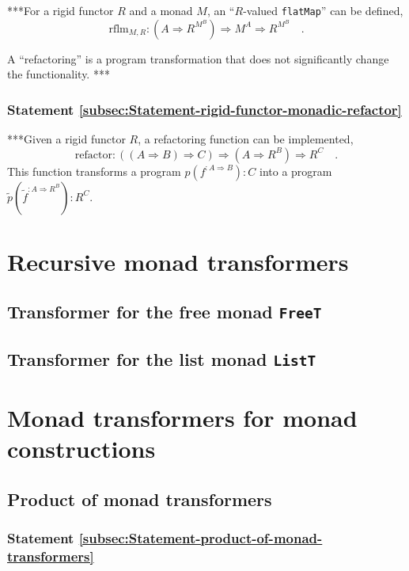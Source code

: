 {*}{*}{*}For a rigid functor $R$ and a monad $M$, an ``$R$-valued
\lstinline!flatMap!''
can be defined,
\[
\text{rflm}_{M,R}:(A\Rightarrow R^{M^{B}})\Rightarrow M^{A}\Rightarrow R^{M^{B}}\quad.
\]

A ``refactoring'' is a program transformation that does not significantly
change the functionality. {*}{*}{*}

\subsubsection{Statement \label{subsec:Statement-rigid-functor-monadic-refactor}\ref{subsec:Statement-rigid-functor-monadic-refactor}}

{*}{*}{*}Given a rigid functor $R$, a refactoring function can be
implemented,
\[
\text{refactor}:((A\Rightarrow B)\Rightarrow C)\Rightarrow(A\Rightarrow R^{B})\Rightarrow R^{C}\quad.
\]
This function transforms a program $p(f^{:A\Rightarrow B}):C$ into
a program $\tilde{p}(\tilde{f}^{:A\Rightarrow R^{B}}):R^{C}$.

\section{Recursive monad transformers}

\subsection{Transformer for the free monad \texttt{FreeT}}

\subsection{Transformer for the list monad \texttt{ListT}}

\section{Monad transformers for monad constructions}

\subsection{Product of monad transformers}

\subsubsection{Statement \label{subsec:Statement-product-of-monad-transformers}\ref{subsec:Statement-product-of-monad-transformers}}

